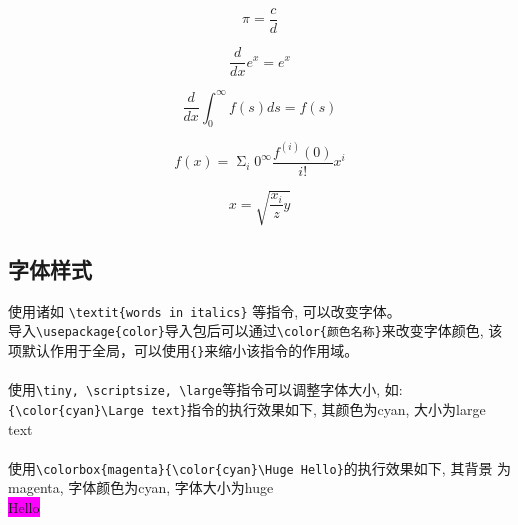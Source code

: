 \documentclass{article}
\begin{document}
            \begin{equation}
            \pi = \frac c d
            \end{equation}

            \begin{equation}
            \frac{d}{dx}e^x=e^x
            \end{equation}

            \begin{equation}
            \frac{d}{dx} \int _0 ^\infty {f(s)ds} = f(s)
            \end{equation}

            \begin{equation}
            f(x) = \mathop{\Sigma} _i 0^{\infty} \frac{f^{(i)}(0)}{i!}x^i
            \end{equation}

            \begin{equation}
            x = \sqrt{\frac{x_i}{z}y}
            \end{equation}

        \subsection {字体样式}
            使用诸如 \verb|\textit{words in italics}| 等指令, 可以改变字体。
            \hspace*{\fill} \\
            导入\verb|\usepackage{color}|导入包后可以通过\verb|\color{颜色名称}|来改变字体颜色, 
            该项默认作用于全局，可以使用\verb|{}|来缩小该指令的作用域。\\
            \hspace*{\fill} \\
            使用\verb|\tiny, \scriptsize, \large|等指令可以调整字体大小, 如: \\
            \verb|{\color{cyan}\Large text}|指令的执行效果如下, 其颜色为cyan, 大小为large\\
            {\color{cyan}\Large text}\\
            \hspace*{\fill} \\
            使用\verb|\colorbox{magenta}{\color{cyan}\Huge Hello}|的执行效果如下, 其背景
            为magenta, 字体颜色为cyan, 字体大小为huge\\
            \colorbox{magenta}{\color{cyan}\Huge Hello}
\end{document}
